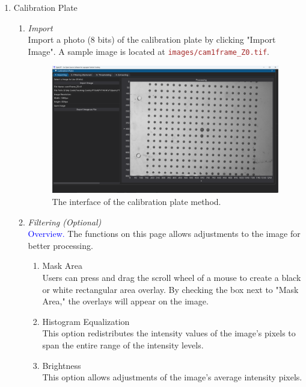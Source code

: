 \documentclass[a4paper,fleqn]{article}
\newcommand{\file}[1]{\textcolor{brown}{\texttt{#1}}}
\begin{document}
\begin{enumerate}
    \item Calibration Plate
    \begin{enumerate}
        \item \textit{Import}\\
    Import a photo (8 bits) of the calibration plate by clicking "Import Image". A sample image is located at \file{images/cam1frame\_Z0.tif}. 
    \begin{figure}[h]
        \centering
        \includegraphics[width=\linewidth]{Fig/GUI_calibplate_import.png}
        \caption{The interface of the calibration plate method.}
        \label{fig:enter-label}
    \end{figure}
    
     \item \textit{Filtering (Optional)}\\
     \textcolor{blue}{Overview. }The functions on this page allows adjustments to the image for better processing.
     
     \begin{enumerate}
         \item Mask Area\\
         Users can press and drag the scroll wheel of a mouse to create a black or white rectangular area overlay. By checking the box next to "Mask Area," the overlays will appear on the image.

         \item Histogram Equalization\\
         This option redistributes the intensity values of the image's pixels to span the entire range of the intensity levels.

         \item Brightness\\
         This option allows adjustments of the image's average intensity pixels.
         

\end{enumerate}
\end{enumerate}
\end{enumerate}
\end{document}
